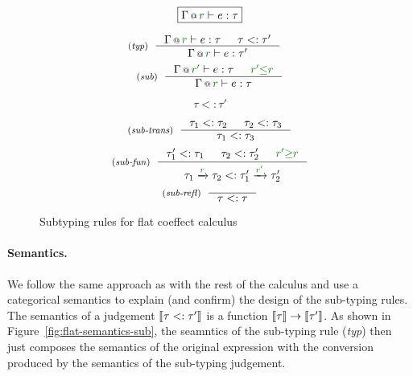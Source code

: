 \begin{figure}[t]

\begin{equation*}
\boxed{\coctx{\Gamma}{\cclrd{r}} \vdash e : \tau}
\end{equation*}

\begin{equation*}
\tyrule{typ}
  { \coctx{\Gamma}{\cclrd{r}} \vdash e : \tau & \tau <: \tau' }
  { \coctx{\Gamma}{\cclrd{r}} \vdash e : \tau' }
\quad
\end{equation*}
\begin{equation*}
\tyrule{sub}
  {\coctx{\Gamma}{\cclrd{r'}} \vdash e : \tau & \cclrd{r'} \cleq \cclrd{r} }
  {\coctx{\Gamma}{\cclrd{r}} \vdash e : \tau }
\end{equation*}

\begin{equation*}
\boxed{\tau <: \tau'}
\end{equation*}

\begin{equation*}
\tyrule{sub-trans}
  { \tau_1 <: \tau_2 & \tau_2 <: \tau_3 }
  { \tau_1 <: \tau_3  }
\end{equation*}
\begin{equation*}
\tyrule{sub-fun}
  { \tau_1' <: \tau_1 & \tau_2 <: \tau_2' & \cclrd{r'} \cgeq \cclrd{r} }
  { \tau_1 \xrightarrow{\cclrd{r}} \tau_2 <: \tau_1' \xrightarrow{\cclrd{r'}} \tau_2' }
\end{equation*}
\begin{equation*}
\tyrule{sub-refl}
  { }
  { \tau <: \tau }
\end{equation*}

\caption{Subtyping rules for flat coeffect calculus}
\label{fig:flat-types-sub}
\end{figure}


\paragraph{Semantics.} We follow the same approach as with the rest of the calculus and use
a categorical semantics to explain (and confirm) the design of the sub-typing rules. The semantics
of a judgement $\llbracket \tau <: \tau' \rrbracket$ is a function $\llbracket \tau \rrbracket \rightarrow \llbracket \tau' \rrbracket$. 
As shown in Figure~\ref{fig:flat-semantics-sub}, the seamntics of the sub-typing rule (\emph{typ}) 
then just composes the semantics of the original expression with the conversion produced by the 
semantics of the sub-typing judgement.


